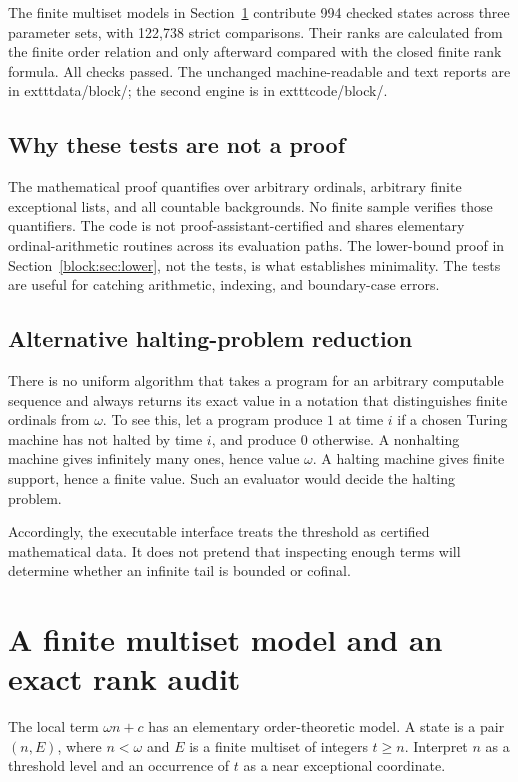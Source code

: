 \documentclass[11pt,a4paper]{article}
\theoremstyle{definition}
\begin{document}
The finite multiset models in Section~\ref{block:app:finite} contribute 994 checked states across three parameter sets, with 122,738 strict comparisons. Their ranks are calculated from the finite order relation and only afterward compared with the closed finite rank formula. All checks passed. The unchanged machine-readable and text reports are in 	exttt{data/block/}; the second engine is in 	exttt{code/block/}.

\subsection{Why these tests are not a proof}

The mathematical proof quantifies over arbitrary ordinals, arbitrary finite exceptional lists, and all countable backgrounds. No finite sample verifies those quantifiers. The code is not proof-assistant-certified and shares elementary ordinal-arithmetic routines across its evaluation paths. The lower-bound proof in Section~\ref{block:sec:lower}, not the tests, is what establishes minimality. The tests are useful for catching arithmetic, indexing, and boundary-case errors.

\subsection{Alternative halting-problem reduction}

There is no uniform algorithm that takes a program for an arbitrary computable sequence and always returns its exact value in a notation that distinguishes finite ordinals from $\omega$. To see this, let a program produce $1$ at time $i$ if a chosen Turing machine has not halted by time $i$, and produce $0$ otherwise. A nonhalting machine gives infinitely many ones, hence value $\omega$. A halting machine gives finite support, hence a finite value. Such an evaluator would decide the halting problem.

Accordingly, the executable interface treats the threshold as certified mathematical data. It does not pretend that inspecting enough terms will determine whether an infinite tail is bounded or cofinal.

\section{A finite multiset model and an exact rank audit}\label{block:app:finite}

The local term $\omega n+c$ has an elementary order-theoretic model. A state is a pair $(n,E)$, where $n<\omega$ and $E$ is a finite multiset of integers $t\ge n$. Interpret $n$ as a threshold level and an occurrence of $t$ as a near exceptional coordinate.
\end{document}

